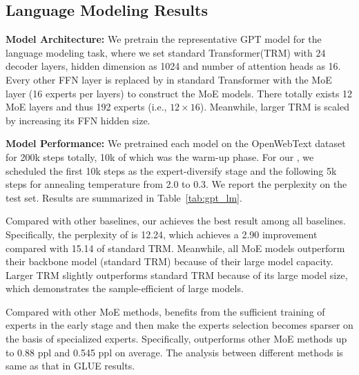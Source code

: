 \subsection{Language Modeling Results}
\textbf{Model Architecture:} We pretrain the representative GPT model for the language modeling task, where we set standard Transformer(TRM) with 24 decoder layers, hidden dimension as 1024 and number of attention heads as 16. 
Every other FFN layer is replaced by in standard Transformer with the MoE layer (16 experts per layers) to construct the MoE models. There totally exists 12 MoE layers and thus 192 experts (i.e., $12 \times 16$).  
Meanwhile, larger TRM is scaled by increasing its FFN hidden size.

\textbf{Model Performance:}
We pretrained each model on the OpenWebText dataset for 200k steps totally, 10k of which was the warm-up phase. For our \ourmethods{}, we scheduled the first 10k steps as the expert-diversify stage and the following 5k steps for annealing temperature from 2.0 to 0.3. We report the perplexity on the test set. Results are summarized in Table~\ref{tab:gpt_lm}.

Compared with other baselines, our \ourmethods{} achieves the best result among all baselines. Specifically, the perplexity of \ourmethods{} is 12.24, which achieves a 2.90 improvement compared with 15.14 of standard TRM. Meanwhile, all MoE models outperform their backbone model (standard TRM) because of their large model capacity. Larger TRM slightly outperforms standard TRM because of its large model size, which demonstrates the sample-efficient of large models.

Compared with other MoE methods, \ourmethods{} benefits from the sufficient training of experts in the early stage and then make the experts selection becomes sparser on the basis of specialized experts. Specifically, \ourmethods{} outperforms other MoE methods up to 0.88 ppl and 0.545 ppl on average. The analysis between different methods is same as that in GLUE results.


